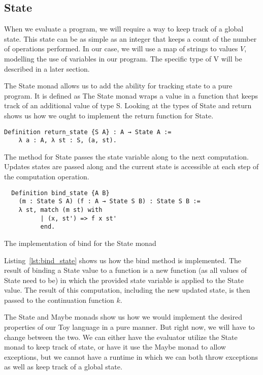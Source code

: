 \subsection{State}
When we evaluate a program, we will require a way to keep track of a global
state. This state can be as simple as an integer that keeps a count of the
number of operations performed. In our case, we will use a map of strings to
values $V$,  modelling the use of variables in our program. The specific type 
of V will be described in a later section.

The State monad allows us to add the ability for tracking state to a pure
program. It is defined as  
The State monad wraps a value in a function that keeps track of an additional value of
type S. Looking at the types of State and return shows us how we ought to
implement the return function for State. 

\begin{verbatim}
Definition return_state {S A} : A → State A := 
    λ a : A, λ st : S, (a, st).
\end{verbatim}

The  method for State passes the state variable along to the next
computation. Updates states are passed along and the current state is
accessible at each step of the computation operation.

\begin{listing}[H]
\begin{verbatim}
  Definition bind_state {A B} 
    (m : State S A) (f : A → State S B) : State S B :=
    λ st, match (m st) with
          | (x, st') => f x st'
          end.
\end{verbatim}
\caption{The implementation of bind for the State monad}
\label{lst:bind_state}
\end{listing}

Listing~\ref{lst:bind_state} shows us how the bind method is implemented. The
result of binding a State value to a function is a new function (as all values
of State need to be) in which the provided state variable is applied to the
State value. The result of this computation, including the new updated state,
is then passed to the continuation function $k$.

The State and Maybe monads show us how we would implement the desired
properties of our Toy language in a pure manner. But right now, we will have to
change between the two. We can either have the evaluator utilize the State
monad to keep track of state, or have it use the Maybe monad to allow
exceptions, but we cannot have a runtime in which we can both throw exceptions
as well as keep track of a global state. 


